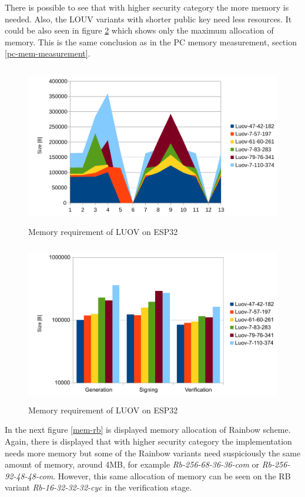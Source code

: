 \documentclass[thesis=M,english]{FITthesis}[2019/12/23]
\begin{document}
\bigskip
\noindent
There is possible to see that with higher security category the more memory is needed. Also, the LOUV variants with shorter public key need less resources. It could be also seen in figure \ref{mem-luov} which shows only the maximum allocation of memory. This is the same conclusion as in the PC memory measurement, section \ref{pc-mem-measurement}.

\newpage
\bigskip\bigskip
\begin{figure}[H]
\centering
\includegraphics[width=13cm,height=7cm]{images/mem-luov0.pdf}
\caption{Memory requirement of LUOV on ESP32}
\label{mem-luov0}
\end{figure}

\bigskip\bigskip\bigskip
\begin{figure}[H]
\centering
\includegraphics[width=13cm,height=7cm]{images/mem-luov.pdf}
\caption{Memory requirement of LUOV on ESP32}
\label{mem-luov}
\end{figure}

\newpage
\noindent
In the next figure \ref{mem-rb} is displayed memory allocation of Rainbow scheme. Again, there is displayed that with higher security category the implementation needs more memory but some of the Rainbow variants need suspiciously the same amount of memory, around 4MB, for example \textit{Rb-256-68-36-36-com} or \textit{Rb-256-92-48-48-com}. However, this same allocation of memory can be seen on the RB variant \textit{Rb-16-32-32-32-cyc} in the verification stage. 
\end{document}
